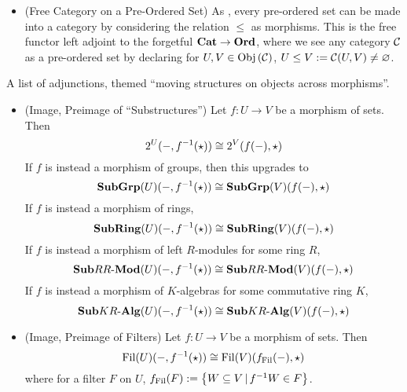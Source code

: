\begin{eg}[Adjunctions]
\begin{itemize}
    \item (Free Category on a Pre-Ordered Set)
    As ,
    every pre-ordered set can be made into a category by considering 
    the relation $\leq$ as morphisms. 
    This is the free functor left adjoint to the forgetful 
    $\mathbf{Cat} \to \mathbf{Ord}$, where we see any category $\mathcal{C}$ as a pre-ordered set by
    declaring for $U, V \in \mathrm{Obj}\left(\mathcal{C}\right)$, $U \leq V := \mathcal{C}(U,V) \neq \varnothing$.

  \end{itemize}

  A list of adjunctions, 
  themed ``moving structures on objects across morphisms''. 
  \begin{itemize}
    \item (Image, Preimage of ``Substructures'')
    Let $f : U \to V$ be a morphism of sets. 
    Then \[
      2^U(-,f^{-1}(\star)) \cong 2^V(f(-),\star)
    \]
    If $f$ is instead a morphism of groups,
    then this upgrades to \[
      \mathbf{Sub}\mathbf{Grp}(U)(-,f^{-1}(\star)) \cong 
      \mathbf{Sub}\mathbf{Grp}(V)(f(-),\star)
    \]
    If $f$ is instead a morphism of rings, 
    \[
      \mathbf{Sub}\mathbf{Ring}(U)(-,f^{-1}(\star)) \cong 
      \mathbf{Sub}\mathbf{Ring}(V)(f(-),\star)
    \]
    If $f$ is instead a morphism of left $R$-modules for some 
    ring $R$, \[
      \mathbf{Sub}RR\text{-}\mathbf{Mod}(U)(-,f^{-1}(\star)) \cong
      \mathbf{Sub}RR\text{-}\mathbf{Mod}(V)(f(-),\star)
    \]
    If $f$ is instead a morphism of $K$-algebras for some commutative ring $K$,
    \[
      \mathbf{Sub}KR\text{-}\mathbf{Alg}(U)(-,f^{-1}(\star)) \cong 
      \mathbf{Sub}KR\text{-}\mathbf{Alg}(V)(f(-),\star)
    \]
    \item (Image, Preimage of Filters)
    Let $f : U \to V$ be a morphism of sets. 
    Then \[
      \operatorname{Fil}(U)(-,{f}^{-1}(\star)) \cong \operatorname{Fil}(V)(f_{\operatorname{Fil}}(-),\star)
    \]
    where for a filter $F$ on $U$,
    $f_{\operatorname{Fil}}(F) := \left\{W \subseteq V \,|\, f^{-1} W \in F\right\}$.
  \end{itemize}


\end{eg}
